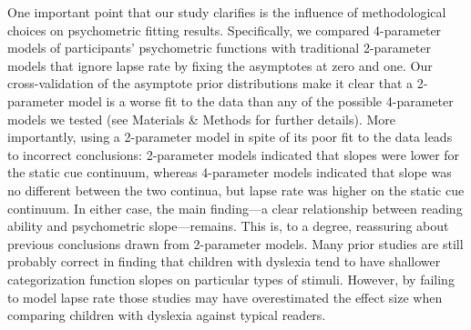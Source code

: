 \documentclass[../uwthesis.tex]{subfiles}
\begin{document}
One important point that our study clarifies is the influence of methodological choices on psychometric fitting results. Specifically, we compared 4-parameter models of participants’ psychometric functions with traditional 2-parameter models that ignore lapse rate by fixing the asymptotes at zero and one. Our cross-validation of the asymptote prior distributions make it clear that a 2-parameter model is a worse fit to the data than any of the possible 4-parameter models we tested (see Materials \& Methods for further details). More importantly, using a 2-parameter model in spite of its poor fit to the data leads to incorrect conclusions: 2-parameter models indicated that slopes were lower for the static cue continuum, whereas 4-parameter models indicated that slope was no different between the two continua, but lapse rate was higher on the static cue continuum. In either case, the main finding—a clear relationship between reading ability and psychometric slope—remains. This is, to a degree, reassuring about previous conclusions drawn from 2-parameter models. Many prior studies are still probably correct in finding that children with dyslexia tend to have shallower categorization function slopes on particular types of stimuli. However, by failing to model lapse rate those studies may have overestimated the effect size when comparing children with dyslexia against typical readers. 
\end{document}
